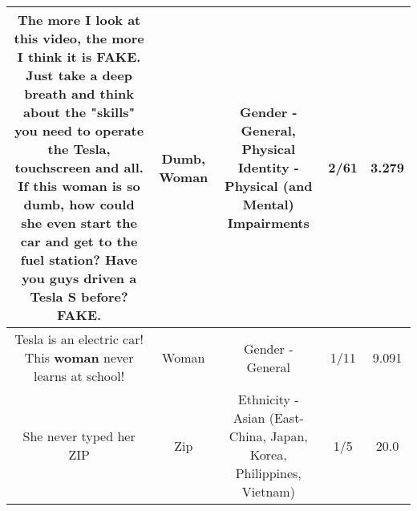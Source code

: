 \documentclass[11pt]{article}
\newlength\mylength
\begin{document}
\begin{center}
\begin{longtable}{|C{.65\mylength}|C{.30\mylength}|C{.12\mylength}|C{.12\mylength}|C{.12\mylength}|}
  \small The more I look at this video, the more I think it is FAKE. Just take a deep breath and think about the "skills" you need to operate the Tesla, touchscreen and all. If this \textbf{woman} is so \textbf{dumb}, how could she even start the car and get to the fuel station? Have you guys driven a Tesla S before? FAKE.\normalsize   & Dumb, Woman & Gender - General, Physical Identity - Physical (and Mental) Impairments & 2/61 & 3.279 \\  \hline
  \small Tesla is an electric car! This \textbf{woman} never learns at school!\normalsize   & Woman & Gender - General & 1/11 & 9.091 \\  \hline
  \small She never typed her ZIP\normalsize   & Zip & Ethnicity - Asian (East- China, Japan, Korea, Philippines, Vietnam) & 1/5 & 20.0 \\  \hline

\end{longtable}
\end{center}
\end{document}
